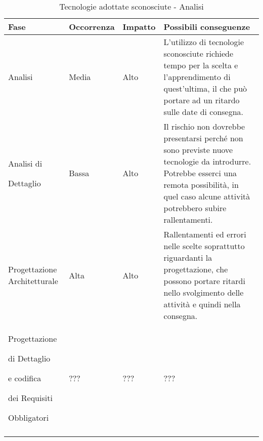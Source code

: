 \documentclass[../PianoProgetto.tex]{subfiles}
\begin{document}
	\hspace{0pt}
		\begin{longtabu} to \textwidth {X[.55] X[c .50] X[c .50] X}
			\toprule
			\textbf{Fase} & \textbf{Occorrenza} & \textbf{Impatto} & \textbf{Possibili conseguenze}\\
			\midrule
			\endhead			
			
			Analisi & Media & Alto & L'utilizzo di tecnologie sconosciute richiede tempo per la scelta e l'apprendimento di quest'ultima, il che può portare ad un ritardo sulle date di consegna. \\
			\midrule
			Analisi di \par Dettaglio & Bassa & Alto & Il rischio non dovrebbe presentarsi perché non sono previste nuove tecnologie da introdurre. Potrebbe esserci una remota possibilità, in quel caso alcune attività potrebbero subire rallentamenti. \\
			\midrule
			Progettazione Architetturale & Alta & Alto & Rallentamenti ed errori nelle scelte soprattutto riguardanti la progettazione, che possono portare ritardi nello svolgimento delle attività e quindi nella consegna.\\
			\midrule
			Progettazione \par di Dettaglio \par e codifica \par dei Requisiti \par Obbligatori & ??? & ??? & ???\\
			\bottomrule
			
			\caption{Tecnologie adottate sconosciute - Analisi}
			\label{tab:Tecnologie adottate sconosciute - Analisi}
		\end{longtabu}

		
	
\end{document}
